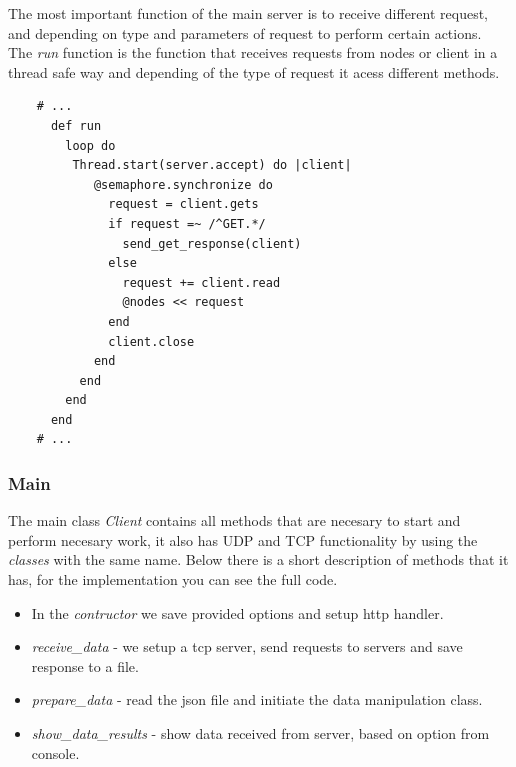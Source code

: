 \documentclass[12pt]{article}
\begin{document}
    The most important function of the main server is to receive different request, and 
    depending on type and parameters of request to perform certain actions.  \\

    The \textit{run} function is the function that receives requests from nodes or
    client in a thread safe way and depending of the type of request it acess different 
    methods. 

    \begin{lstlisting}
    # ...
      def run
        loop do
         Thread.start(server.accept) do |client|
            @semaphore.synchronize do
              request = client.gets
              if request =~ /^GET.*/
                send_get_response(client)
              else
                request += client.read
                @nodes << request
              end
              client.close
            end
          end
        end
      end
    # ... 
    \end{lstlisting}
        
    \subsubsection{Main}

    The main class \textit{Client} contains all methods that are necesary to start and perform necesary
    work, it also has UDP and TCP functionality by using the  \textit{classes} with the same name.
    Below there is a short description of methods that it has, for the implementation you can see the full code.

    \begin{itemize}
      \renewcommand{\labelitemi}{$\circ$}
      \item In the \textit{contructor} we save provided options and setup http handler.
      \item  \textit{receive\_data} - we setup a tcp server, send requests to servers and save response to a file.
      \item \textit{prepare\_data} - read the json file and initiate the data manipulation class.
      \item \textit{show\_data\_results} - show data received from server, based on option from console.
    \end{itemize}
\end{document}
